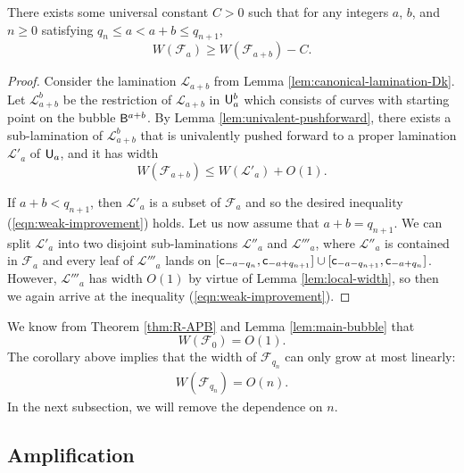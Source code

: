 \documentclass{amsart}
\begin{document}
\begin{proposition}
\label{prop:weak-improvement}
    There exists some universal constant $C>0$ such that for any integers $a$, $b$, and $n\geq 0$ satisfying $q_{n} \leq a < a+b \leq q_{n+1}$, 
    \begin{equation}
    \label{eqn:weak-improvement}
       W(\mathcal{F}_a) \geq   W(\mathcal{F}_{a+b})- C.
    \end{equation}
\end{proposition}

\begin{proof}
    Consider the lamination $\mathcal{L}_{a+b}$ from Lemma \ref{lem:canonical-lamination-Dk}. 
    Let $\mathcal{L}^b_{a+b}$ be the restriction of $\mathcal{L}_{a+b}$ in $\mathsf{U}^b_a$ which consists of curves with starting point on the bubble $\mathsf{B}^{a+b}$. 
    By Lemma \ref{lem:univalent-pushforward}, there exists a sub-lamination of $\mathcal{L}^{b}_{a+b}$ that is univalently pushed forward to a proper lamination $\mathcal{L}'_a$ of $\mathsf{U}_a$, and it has width
    \[
        W(\mathcal{F}_{a+b}) \leq W(\mathcal{L}'_a) + O(1).
    \]

    If $a+b < q_{n+1}$, then $\mathcal{L}'_a$ is a subset of $\mathcal{F}_a$ and so the desired inequality (\ref{eqn:weak-improvement}) holds. 
    Let us now assume that $a+b = q_{n+1}$. 
    We can split $\mathcal{L}'_a$ into two disjoint sub-laminations $\mathcal{L}''_a$ and $\mathcal{L}'''_a$, where $\mathcal{L}''_a$ is contained in $\mathcal{F}_a$ and every leaf of $\mathcal{L}'''_a$ lands on $[\mathsf{c}_{-a-q_{n}},\mathsf{c}_{-a+q_{n+1}}] \cup [\mathsf{c}_{-a-q_{n+1}},\mathsf{c}_{-a+q_{n}}]$. However, $\mathcal{L}'''_a$ has width $O(1)$ by virtue of Lemma \ref{lem:local-width}, so then we again arrive at the inequality (\ref{eqn:weak-improvement}).
\end{proof}

We know from Theorem \ref{thm:R-APB} and Lemma \ref{lem:main-bubble} that 
\[
    W(\mathcal{F}_0) = O(1).
\]
The corollary above implies that the width of $\mathcal{F}_{q_n}$ can only grow at most linearly:
\begin{align}
    \label{eqn:W-linear}
    W(\mathcal{F}_{q_n}) = O(n).
\end{align}
In the next subsection, we will remove the dependence on $n$.

\subsection{Amplification}
\end{document}
